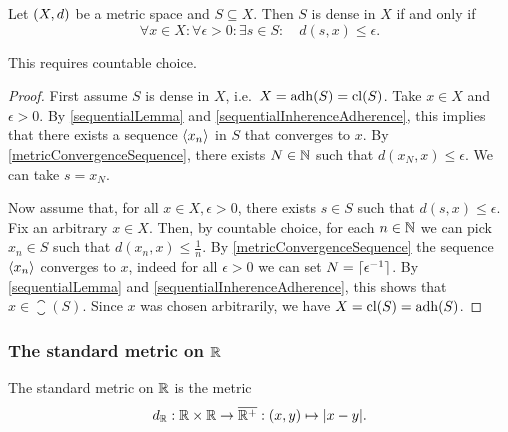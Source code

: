 \begin{lemma} \label{metricDensityLemma}
Let $\sSet{X,d}$ be a metric space and $S\subseteq X$. Then $S$ is dense in $X$ \textup{if and only if}
\[ \forall x\in X: \forall \epsilon >0: \exists s\in S: \quad d(s,x) \leq \epsilon. \]
\end{lemma}
This requires countable choice.
\begin{proof}
First assume $S$ is dense in $X$, i.e.\ $X = \operatorname{adh}(S) = \operatorname{cl}(S)$. Take $x\in X$ and $\epsilon >0$. By \ref{sequentialLemma} and \ref{sequentialInherenceAdherence}, this implies that there exists a sequence $\left\langle x_n \right\rangle$ in $S$ that converges to $x$. By \ref{metricConvergenceSequence}, there exists $N\in \mathbb{N}$ such that $d(x_N, x)\leq \epsilon$. We can take $s = x_N$.

Now assume that, for all $x\in X, \epsilon >0$, there exists $s\in S$ such that $d(s,x)\leq \epsilon$. Fix an arbitrary $x\in X$. Then, by countable choice, for each $n\in \mathbb{N}$ we can pick $x_n\in S$ such that $d(x_n, x)\leq \frac{1}{n}$. By \ref{metricConvergenceSequence} the sequence $\left\langle x_n \right\rangle$ converges to $x$, indeed for all $\epsilon >0$ we can set $N = \lceil\epsilon^{-1}\rceil$. By \ref{sequentialLemma} and \ref{sequentialInherenceAdherence}, this shows that $x\in \closure(S)$. Since $x$ was chosen arbitrarily, we have $X = \operatorname{cl}(S) = \operatorname{adh}(S)$.
\end{proof}


\subsubsection{The standard metric on $\mathbb{R}$}
\begin{definition}
The standard metric on $\mathbb{R}$ is the metric
\[ d_{\mathbb{R}}: \mathbb{R}\times \mathbb{R}\to\overline{\mathbb{R}^+}: (x,y) \mapsto |x-y|. \]
\end{definition}

